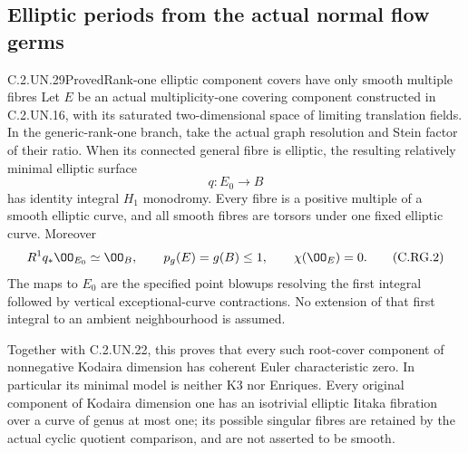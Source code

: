 \subsection{Elliptic periods from the actual normal flow germs}

\begin{statement}{C.2.UN.29}{Proved}{Rank-one elliptic component covers have only smooth multiple fibres}
Let $E$ be an actual multiplicity-one covering component
constructed in C.2.UN.16, with its saturated two-dimensional
space of limiting translation fields. In the generic-rank-one
branch, take the actual graph resolution and Stein factor
of their ratio. When its connected general fibre is elliptic,
the resulting relatively minimal elliptic surface
\[
                         q:E_0\longrightarrow B
                                                               \tag{C.RG.1}
\]
has identity integral $H_1$ monodromy. Every fibre is a
positive multiple of a smooth elliptic curve, and all smooth
fibres are torsors under one fixed elliptic curve. Moreover
\[
 R^1q_*\OO_{E_0}\simeq\OO_B,\qquad
 p_g(E)=g(B)\le1,\qquad \chi(\OO_E)=0.
                                                               \tag{C.RG.2}
\]
The maps to $E_0$ are the specified point blowups resolving
the first integral followed by vertical exceptional-curve
contractions. No extension of that first integral to an
ambient neighbourhood is assumed.

Together with C.2.UN.22, this proves that every such root-cover
component of nonnegative Kodaira dimension has coherent
Euler characteristic zero. In particular its minimal model
is neither K3 nor Enriques. Every original component of
Kodaira dimension one has an isotrivial elliptic Iitaka
fibration over a curve of genus at most one; its possible
singular fibres are retained by the actual cyclic quotient
comparison, and are not asserted to be smooth.
\end{statement}
